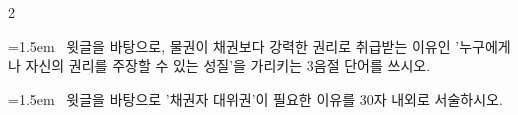 \documentclass[10pt, a4paper]{article}
\begin{document}
\begin{multicols}{2}
\noindent\begin{minipage}{\columnwidth}
\vspace{2mm}
{\hangindent=1.5em  ~윗글을 바탕으로, 물권이 채권보다 강력한 권리로 취급받는 이유인 '누구에게나 자신의 권리를 주장할 수 있는 성질'을 가리키는 3음절 단어를 쓰시오.\par}

\vspace{3mm}
\noindent\hrulefill
\vspace{2.5mm}
\noindent\hrulefill
\vspace{2.5mm}
\noindent\hrulefill
\vspace{2.5mm}
\noindent\hrulefill
\vspace{2.5mm}
\noindent\hrulefill
\vspace{2.5mm}
\vspace{1mm}
\vspace{4mm}
\end{minipage}
\par

\noindent\begin{minipage}{\columnwidth}
\vspace{2mm}
{\hangindent=1.5em  ~윗글을 바탕으로 '채권자 대위권'이 필요한 이유를 30자 내외로 서술하시오.\par}

\vspace{3mm}
\noindent\hrulefill
\vspace{2.5mm}
\noindent\hrulefill
\vspace{2.5mm}
\noindent\hrulefill
\vspace{2.5mm}
\noindent\hrulefill
\vspace{2.5mm}
\noindent\hrulefill
\vspace{2.5mm}
\vspace{1mm}
\vspace{4mm}
\end{minipage}
\par


\vspace{1mm}
\vspace{0.5mm}


\end{multicols}
\end{document}
